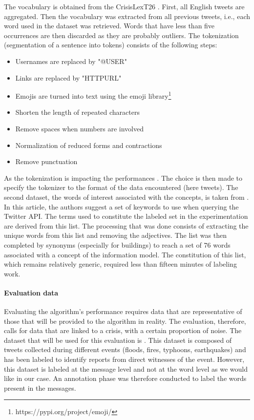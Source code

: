 The vocabulary is obtained from the CrisisLexT26 \parencite{olteanuWhatExpectWhen2015}.
First, all English tweets are aggregated.
Then the vocabulary was extracted from all previous tweets, i.e., each word used in the dataset was retrieved.
Words that have less than five occurrences are then discarded as they are probably outliers.
The tokenization (segmentation of a sentence into tokens) consists of the following steps:

\begin{itemize}
    \item Usernames are replaced by "@USER"
    \item Links are replaced by "HTTPURL"
    \item Emojis are turned into text using the emoji library\footnote{https://pypi.org/project/emoji/}
    \item Shorten the length of repeated characters
    \item Remove spaces when numbers are involved
    \item Normalization of reduced forms and contractions
    \item Remove punctuation
\end{itemize}

As the tokenization is impacting the performances \parencite[p. 21]{farzindarNaturalLanguageProcessing2017}.
The choice is then made to specify the tokenizer to the format of the data encountered (here tweets).
The second dataset, the words of interest associated with the concepts, is taken from \textcite{olteanuCrisisLexLexiconCollecting2014}.
In this article, the authors suggest a set of keywords to use when querying the Twitter API.
The terms used to constitute the labeled set in the experimentation are derived from this list.
The processing that was done consists of extracting the unique words from this list and removing the adjectives.
The list was then completed by synonyms (especially for buildings) to reach a set of 76 words associated with a concept of the information model.
The constitution of this list, which remains relatively generic, required less than fifteen minutes of labeling work.

\paragraph{Evaluation data}
Evaluating the algorithm's performance requires data that are representative of those that will be provided to the algorithm in reality.
The evaluation, therefore, calls for data that are linked to a crisis, with a certain proportion of noise.
The dataset that will be used for this evaluation is \textcite{zahraAutomaticIdentificationEyewitness2020}.
This dataset is composed of tweets collected during different events (floods, fires, typhoons, earthquakes)
and has been labeled to identify reports from direct witnesses of the event.
However, this dataset is labeled at the message level and not at the word level as we would like in our case.
An annotation phase was therefore conducted to label the words present in the messages.

